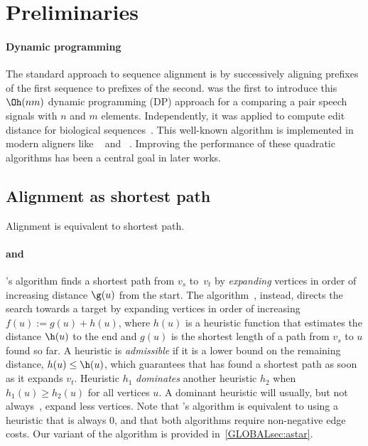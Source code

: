 \section{Preliminaries}

\paragraph{Dynamic programming} The standard approach to sequence alignment is
by successively aligning prefixes of the first sequence to prefixes of the
second. \citet{vintsyuk1968speech} was the first to introduce this $\Oh(nm)$
dynamic programming (DP) approach for a comparing a pair speech signals with $n$
and $m$ elements. Independently, it was applied to compute edit distance for
biological
sequences~\citep{needleman1970general,sankoff1972matching,sellers1974theory,wagner1974string}.
This well-known algorithm is implemented in modern aligners  like
\seqan~\citep{reinert2017seqan} and \parasail~\citep{daily2016parasail}.
Improving the performance of these quadratic algorithms has been a central goal
in later works.

\subsection{Alignment as shortest path}

Alignment is equivalent to shortest path.

\paragraph{\dijkstra and \A}
\dijkstra's algorithm \citep{dijkstra1959note} finds a shortest path from $v_s$
to~$v_t$ by \emph{expanding} vertices in order of increasing distance $\g(u)$
from the start. The \A algorithm~\citep{hart1968formal,pearl1984heuristics},
instead, directs the search towards a target by expanding vertices in order of
increasing ${f(u) := g(u) + h(u)}$, where $h(u)$ is a heuristic function that
estimates the distance $\h(u)$ to the end and $g(u)$ is the shortest length of a
path from $v_s$ to $u$ found so far. A heuristic is \emph{admissible} if it is a
lower bound on the remaining distance, $h(u) \leq \h(u)$, which guarantees that
\A has found a shortest path as soon as it expands $v_t$. Heuristic $h_1$
\emph{dominates} another heuristic $h_2$ when $h_1(u) \ge h_2(u)$ for all vertices $u$.
A dominant heuristic will usually, but not always~\citep{holte2010common},
expand less vertices. Note that \dijkstra's algorithm is
equivalent to \A using a heuristic that is always $0$, and that both algorithms
require non-negative edge costs. Our variant of the \A algorithm is provided
in~\cref{GLOBALsec:astar}.

